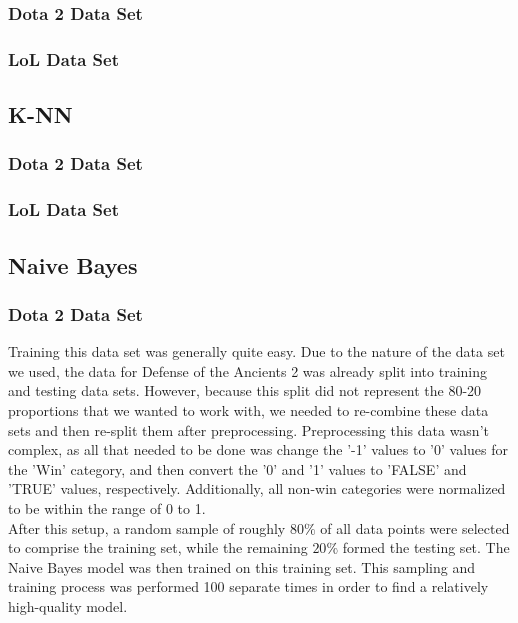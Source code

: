\documentclass[sigconf]{acmart}
\begin{document}
\subsubsection{Dota 2 Data Set }

\subsubsection{LoL Data Set}

\subsection{K-NN}

\subsubsection{Dota 2 Data Set }

\subsubsection{LoL Data Set}

\subsection{Naive Bayes}

\subsubsection{Dota 2 Data Set }
Training this data set was generally quite easy. Due to the nature of the data set we used, the data for Defense of the Ancients 2 was already split into training and testing data sets. However, because this split did not represent the 80-20 proportions that we wanted to work with, we needed to re-combine these data sets and then re-split them after preprocessing. Preprocessing this data wasn't complex, as all that needed to be done was change the '-1' values to '0' values for the 'Win' category, and then convert the '0' and '1' values to 'FALSE' and 'TRUE' values, respectively. Additionally, all non-win categories were normalized to be within the range of 0 to 1.\\
After this setup, a random sample of roughly $80\%$ of all data points were selected to comprise the training set, while the remaining $20\%$ formed the testing set. The Naive Bayes model was then trained on this training set. This sampling and training process was performed 100 separate times in order to find a relatively high-quality model.
\end{document}

